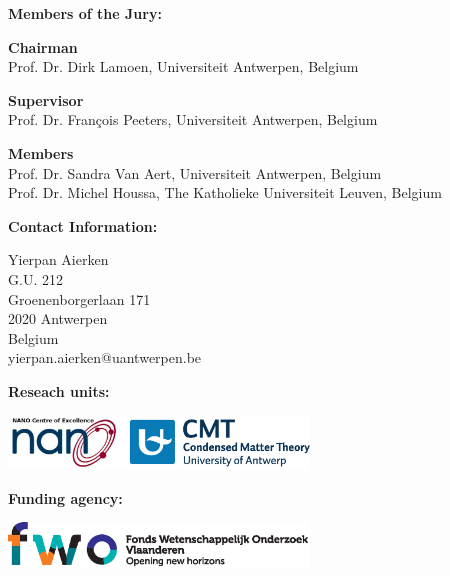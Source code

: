 \clearpage

\thispagestyle{empty}

\begin{list}{}{\leftmargin=0cm}

\item \textbf{Members of the Jury:}

\item \textbf{Chairman} \\
Prof. Dr. Dirk Lamoen, Universiteit Antwerpen, Belgium \\

\item \textbf{Supervisor} \\
Prof. Dr. Fran\c{c}ois Peeters, Universiteit Antwerpen, Belgium\\

\item \textbf{Members} \\
Prof. Dr. Sandra Van Aert, Universiteit Antwerpen, Belgium \\
Prof. Dr. Michel Houssa, The Katholieke Universiteit Leuven, Belgium \\
\end{list}

\vspace{0.7cm}

\begin{list}{}{\leftmargin=0cm}
            \item \textbf{Contact Information:}
            \item    Yierpan Aierken \\
            G.U. 212 \\
            Groenenborgerlaan 171 \\
            2020 Antwerpen \\
            Belgium \\
            yierpan.aierken@uantwerpen.be
\end{list}
\vspace{0.7cm}

\begin{list}{}{\leftmargin=0cm}
\item \textbf{Reseach units:}
\begin{flushleft}
\includegraphics[width =0.6\textwidth]{Figs/research_units.eps}
\end{flushleft}
\end{list}

\vfill
\begin{list}{}{\leftmargin=0cm}
\item \textbf{Funding agency:}
\begin{flushleft}
\includegraphics[width =0.6\textwidth]{Figs/FWO.eps}
\end{flushleft}
\end{list}